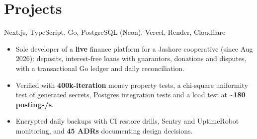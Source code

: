 \documentclass[10pt,a4paper]{article}
\begin{document}
\section{Projects}

{ \textbar{} }
{Next.js, TypeScript, Go, PostgreSQL (Neon), Vercel, Render, Cloudflare}
{\begin{itemize}
  \item Sole developer of a \textbf{live} finance platform for a Jashore cooperative (since Aug 2026): deposits, interest-free loans with guarantors, donations and disputes, with a transactional Go ledger and daily reconciliation.
  \item Verified with \textbf{400k-iteration} money property tests, a chi-square uniformity test of generated secrets, Postgres integration tests and a load test at \textbf{\textasciitilde180 postings/s}.
  \item Encrypted daily backups with CI restore drills, Sentry and UptimeRobot monitoring, and \textbf{45 ADRs} documenting design decisions.
\end{itemize}}











\end{document}
